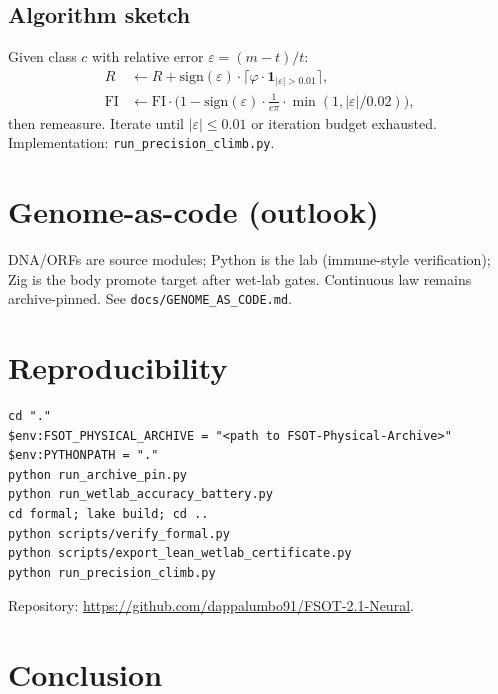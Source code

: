 \documentclass[11pt,a4paper]{article}
\begin{document}
\subsection{Algorithm sketch}
Given class \(c\) with relative error \(\varepsilon=(m-t)/t\):
\begin{align}
R &\leftarrow R + \mathrm{sign}(\varepsilon)\cdot\Big\lceil \varphi\cdot\mathbf{1}_{|\varepsilon|>0.01}\Big\rceil,\\
\mathrm{FI} &\leftarrow \mathrm{FI}\cdot\bigl(1 - \mathrm{sign}(\varepsilon)\cdot\tfrac{1}{e\pi}\cdot\min(1,|\varepsilon|/0.02)\bigr),
\end{align}
then remeasure. Iterate until \(|\varepsilon|\le 0.01\) or iteration budget
exhausted. Implementation: \texttt{run\_precision\_climb.py}.

\section{Genome-as-code (outlook)}
\label{sec:genome}

DNA/ORFs are source modules; Python is the lab (immune-style verification);
Zig is the body promote target after wet-lab gates. Continuous law remains
archive-pinned. See \texttt{docs/GENOME\_AS\_CODE.md}.

\section{Reproducibility}
\label{sec:repro}

\begin{verbatim}
cd "."
$env:FSOT_PHYSICAL_ARCHIVE = "<path to FSOT-Physical-Archive>"
$env:PYTHONPATH = "."
python run_archive_pin.py
python run_wetlab_accuracy_battery.py
cd formal; lake build; cd ..
python scripts/verify_formal.py
python scripts/export_lean_wetlab_certificate.py
python run_precision_climb.py
\end{verbatim}

Repository: \url{https://github.com/dappalumbo91/FSOT-2.1-Neural}.

\section{Conclusion}
\label{sec:conclusion}
\end{document}
